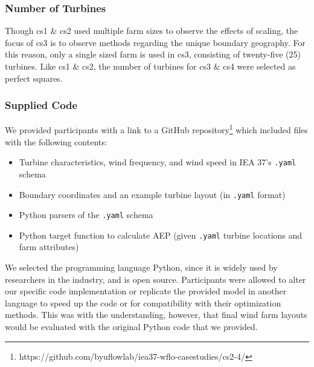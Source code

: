 	\subsubsection{Number of Turbines}
        Though cs1 \& cs2 used multiple farm sizes to observe the effects of scaling, the focus of cs3 is to observe methods regarding the unique boundary geography.
        For this reason, only a single sized farm is used in cs3, consisting of twenty-five (25) turbines.
        Like cs1 \& cs2, the number of turbines for cs3 \& cs4 were selected as perfect squares.
        
    \subsubsection{Supplied Code} \label{sec:code}

        We provided participants with a link to a GitHub repository\footnote{https://github.com/byuflowlab/iea37-wflo-casestudies/cs2-4/} which included files with the following contents:
            \begin{itemize}
                \item Turbine characteristics, wind frequency, and wind speed in IEA 37's \texttt{.yaml} schema
                \item Boundary coordinates and an example turbine layout (in \texttt{.yaml} format)
                \item Python parsers of the \texttt{.yaml} schema
                \item Python target function to calculate AEP (given \texttt{.yaml} turbine locations and farm attributes)
            \end{itemize}
        We selected the programming language Python, since it is widely used by researchers in the industry, and is open source.
        Participants were allowed to alter our specific code implementation or replicate the provided model in another language to speed up the code or for compatibility with their optimization methods. 
        This was with the understanding, however, that final wind farm layouts would be evaluated with the original Python code that we provided.